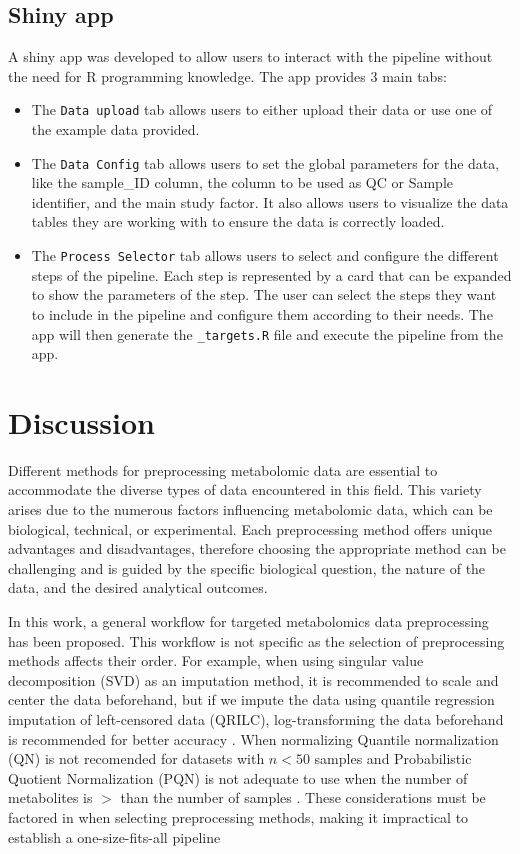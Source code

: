 \documentclass[ENG, BIB]{TFUOC}%
\begin{document}
\section{Shiny app}

A shiny app was developed to allow users to interact with the pipeline without the need for R programming knowledge. The app provides 3 main tabs:
\begin{itemize}
    \item The \texttt{Data upload} tab allows users to either upload their data or use one of the example data provided.
    \item The \texttt{Data Config} tab allows users to set the global parameters for the data, like the sample\_ID column, the column to be used as QC or Sample identifier, and the main study factor. It also allows users to visualize the data tables they are working with to ensure the data is correctly loaded.
    \item The \texttt{Process Selector} tab allows users to select and configure the different steps of the pipeline. Each step is represented by a card that can be expanded to show the parameters of the step. The user can select the steps they want to include in the pipeline and configure them according to their needs. The app will then generate the \texttt{\_targets.R} file and execute the pipeline from the app.
\end{itemize}

\chapter{Discussion}
Different methods for preprocessing metabolomic data are essential to accommodate the diverse types of data encountered in this field. This variety arises due to the numerous factors influencing metabolomic data, which can be biological, technical, or experimental. Each preprocessing method offers unique advantages and disadvantages, therefore choosing the appropriate method can be challenging and is guided by the specific biological question, the nature of the data, and the desired analytical outcomes.

In this work, a general workflow for targeted metabolomics data preprocessing has been proposed. This workflow is not specific as the selection of preprocessing methods affects their order. For example, when using singular value decomposition (SVD) as an imputation method, it is recommended to scale and center the data beforehand, but if we impute the data using quantile regression imputation of left-censored data (QRILC), log-transforming the data beforehand is recommended for better accuracy \cite{weiMissingValueImputation2018}. When normalizing Quantile normalization (QN) is not recomended for datasets with $n < 50$ samples \cite{kohlStateoftheArtData2012} and Probabilistic Quotient Normalization (PQN) is not adequate to use when the number of metabolites is $>$ than the number of samples \cite{dongGroupAggregatingNormalization2011}.
These considerations must be factored in when selecting preprocessing methods, making it impractical to establish a one-size-fits-all pipeline
\end{document}
